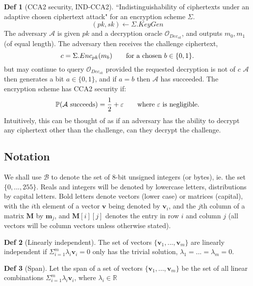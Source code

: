 \documentclass[a4paper, 10pt]{article}
\theoremstyle{definition}
\newtheorem{definition}{Def}[section]
\begin{document}
\begin{definition}[\ac{CCA2} security, \ac{IND}-\ac{CCA2}]
    ``Indistinguishability of ciphertexts under an adaptive chosen ciphertext attack" for an encryption scheme $\Sigma $.\\
    \[(pk, sk) \leftarrow \Sigma.KeyGen \]
    The adversary $\mathcal{A} $ is given $pk$ and a decryption oracle $\mathcal{O}_{Dec_{sk}}$, and outputs $m_0, m_1$ (of equal length). The adversary then receives the challenge ciphertext,
    \[c=\Sigma .Enc_{pk}(m_b)\text{\qquad for a chosen }b \in \{ 0,1\}.\]
    but may continue to query $\mathcal{O}_{Dec_{sk}}$ provided the requested decryption is not of $c$
    $\mathcal{A} $ then generates a bit $a \in \{ 0, 1\}$, and if $a=b$ then $\mathcal{A} $ has succeeded.
    The encryption scheme has \ac{CCA2} security if:
    \[\mathbb{P} (\mathcal{A} \text{ succeeds}) = \frac{1}{2} + \varepsilon \text{\qquad where $\varepsilon$ is negligible.}\]
    Intuitively, this can be thought of as if an adversary has the ability to decrypt any ciphertext other than the challenge, can they decrypt the challenge.
\end{definition}

\subsection{Notation}

We shall use $\mathcal{B} $ to denote the set of 8-bit unsigned integers (or bytes), ie. the set $\{0, ..., 255\}$. Reals and integers will be denoted by lowercase letters, distributions by capital letters. Bold letters denote vectors (lower case) or matrices (capital), with the $i$th element of a vector $\mathbf{v}$ being denoted by $\mathbf{v}_i$, and the $j$th column of a matrix $\mathbf{M}$ by $\mathbf{m}_j$, and $\mathbf{M}[i][j]$ denotes the entry in row $i$ and column $j$ (all vectors will be column vectors unless otherwise stated).

\begin{definition}[Linearly independent]
    The set of vectors $\{\textbf{v}_1,...,\textbf{v}_m\}$ are linearly independent if $\Sigma_{i=1}^m \lambda _i \mathbf{v}_i = 0$ only has the trivial solution, $\lambda _1 = ... = \lambda _m = 0$.
\end{definition}

\begin{definition}[Span]
    Let the span of a set of vectors $\{\textbf{v}_1,...,\textbf{v}_m\}$ be the set of all linear combinations $\Sigma_{i=1}^m \lambda _i \mathbf{v}_i$, where $\lambda _i \in \mathbb{R}$
\end{definition}
\end{document}
